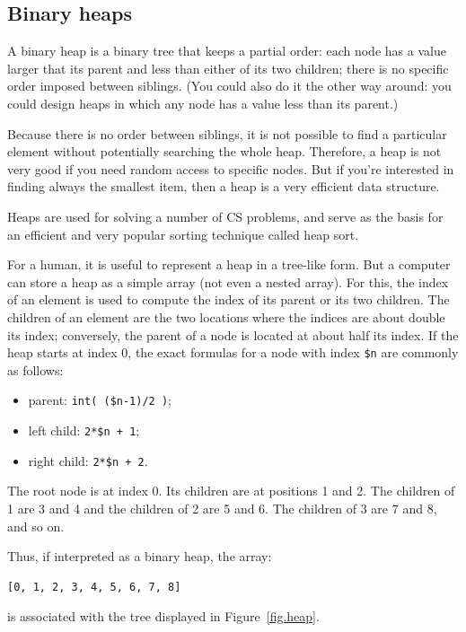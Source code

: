 \subsection{Binary heaps}
\label{heap}

A binary heap is a binary tree that keeps a partial order: each 
node has a value larger that its parent and less than 
either of its two children; there is no specific order imposed 
between siblings. (You could also do it the other way 
around: you could design heaps in which any node has a value 
less than its parent.)

Because there is no order between siblings, it is not possible 
to find a particular element without potentially searching the 
whole heap. Therefore, a heap is not very good if you need 
random access to specific nodes. But if you're interested 
in finding always the smallest item, then a heap is a 
very efficient data structure.

Heaps are used for solving a number of CS problems, and serve 
as the basis for an efficient and very popular sorting technique 
called heap sort.

For a human, it is useful to represent a heap in a tree-like 
form. But a computer can store a heap as a simple array (not 
even a nested array). For this, the index of an element is 
used to compute the index of its parent or its two children.
The children of an element are the two locations where the 
indices are about double its index; conversely, the parent 
of a node is located at about half its index. If the heap 
starts at index 0, the exact formulas for a node with index 
\verb'$n' are commonly as follows:
\begin{itemize}
\item parent: \verb'int( ($n-1)/2 )';
\item left child: \verb'2*$n + 1';
\item right child: \verb'2*$n + 2'.
\end{itemize}
The root node is at index 0. Its children are at positions 
1 and 2. The children of 1 are 3 and 4 and the children of 
2 are 5 and 6. The children of 3 are 7 and 8, and so on.

Thus, if interpreted as a binary heap, the array:
\begin{verbatim}
[0, 1, 2, 3, 4, 5, 6, 7, 8]
\end{verbatim}

is associated with the tree displayed in Figure~\ref{fig.heap}.

